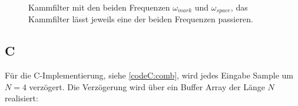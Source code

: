 \documentclass{article}
\begin{document}
\begin{figure}[!h]
    \label{fig:comb}
    \centering
    \def\svgscale{0.3}
    \def\svgwidth{0.8\columnwidth}
    \caption{Kammfilter mit den beiden Frequenzen $\omega_{mark}$ und $\omega_{space}$, das Kammfilter lässt jeweils eine der beiden Frequenzen passieren.}
\end{figure}
\subsection{C}
Für die C-Implementierung, siehe \ref{codeC:comb}, wird jedes Eingabe Sample um $N = 4$ verzögert.
Die Verzögerung wird über ein Buffer Array der Länge $N$ realisiert:
% 
%
%
%            
%
\end{document}
